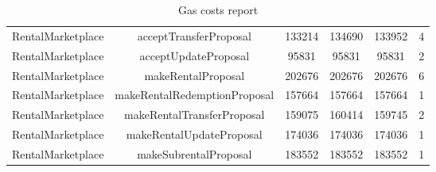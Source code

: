 \documentclass[english, LaM, oneside]{sapthesis}%
\begin{document}
\begin{table}
\begin{adjustbox}{width=0.75\textwidth}
\begin{tabular}{@{}cccccc@{}}
RentalMarketplace  & acceptTransferProposal       & 133214       & 134690       & 133952       & 4                \\
RentalMarketplace  & acceptUpdateProposal         & 95831        & 95831        & 95831        & 2                \\
RentalMarketplace  & makeRentalProposal           & 202676       & 202676       & 202676       & 6                \\
RentalMarketplace  & makeRentalRedemptionProposal & 157664       & 157664       & 157664       & 1                \\
RentalMarketplace  & makeRentalTransferProposal   & 159075       & 160414       & 159745       & 2                \\
RentalMarketplace  & makeRentalUpdateProposal     & 174036       & 174036       & 174036       & 1                \\
RentalMarketplace  & makeSubrentalProposal        & 183552       & 183552       & 183552       & 1                \\ \bottomrule
\end{tabular}
\end{adjustbox}
\caption{Gas costs report}
\label{tab:Gas report}
\end{table}
\end{document}
